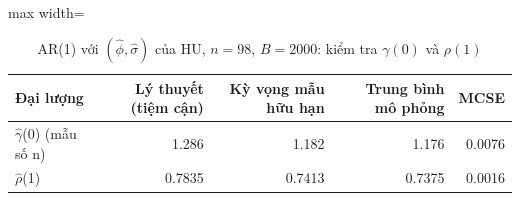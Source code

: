 \begin{table}[H]
\centering\footnotesize
\caption{AR(1) với $(\hat\phi,\hat\sigma)$ của HU, $n=98$, $B=2000$: kiểm tra $\gamma(0)$ và $\rho(1)$}\label{tab:tab_b11_06_ar1_simulation}
\begin{adjustbox}{max width=\linewidth}
\begin{tabular}{|l|r|r|r|r|}
\toprule
Đại lượng & Lý thuyết (tiệm cận) & Kỳ vọng mẫu hữu hạn & Trung bình mô phỏng & MCSE \\
\midrule
$\hat{\gamma}$(0) (mẫu số n) & 1.286 & 1.182 & 1.176 & 0.0076 \\
$\hat{\rho}$(1) & 0.7835 & 0.7413 & 0.7375 & 0.0016 \\
\bottomrule
\end{tabular}
\end{adjustbox}\par{}
\end{table}
